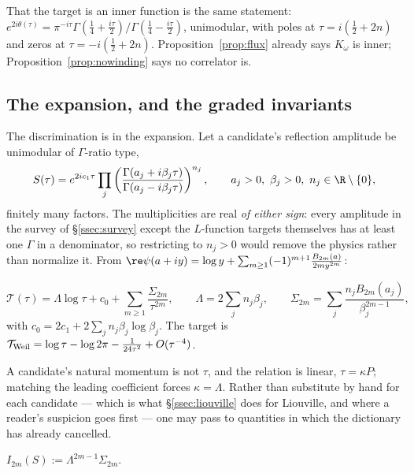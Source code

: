 That the target is an inner function is the same statement:
$e^{2i\theta(\tau)}=\pi^{-i\tau}\Gamma(\frac14+\frac{i\tau}2)/
\Gamma(\frac14-\frac{i\tau}2)$, unimodular, with poles at $\tau=i(\frac12+2n)$ and
zeros at $\tau=-i(\frac12+2n)$. Proposition~\ref{prop:flux} already says
$K_\omega$ is inner; Proposition~\ref{prop:nowinding} says no correlator is.

\subsection{The expansion, and the graded invariants}\label{ssec:invariants}

The discrimination is in the expansion. Let a candidate's reflection amplitude be
unimodular of $\Gamma$-ratio type,
\begin{equation}\label{eq:gammaratio}
 S(\tau)=e^{2ic_1\tau}\prod_j
 \left(\frac{\Gamma(a_j+i\beta_j\tau)}{\Gamma(a_j-i\beta_j\tau)}\right)^{n_j},
 \qquad a_j>0,\ \beta_j>0,\ n_j\in\R\setminus\{0\},
\end{equation}
finitely many factors. The multiplicities are real \emph{of either sign}: every
amplitude in the survey of \S\ref{ssec:survey} except the $L$-function targets
themselves has at least one $\Gamma$ in a denominator, so restricting to $n_j>0$
would remove the physics rather than normalize it. From
$\re\psi(a+iy)=\log y+\sum_{m\geq1}(-1)^{m+1}\frac{B_{2m}(a)}{2my^{2m}}$:

\begin{proposition}\label{prop:expansion}
\[
 \mathcal T(\tau)=\Lambda\log\tau+c_0
 +\sum_{m\geq1}\frac{\Sigma_{2m}}{\tau^{2m}},
 \qquad \Lambda=2\sum_jn_j\beta_j,\qquad
 \Sigma_{2m}=\sum_j\frac{n_jB_{2m}(a_j)}{\beta_j^{2m-1}},
\]
with $c_0=2c_1+2\sum_jn_j\beta_j\log\beta_j$. The target is
$\mathcal T_{\rm Weil}=\log\tau-\log2\pi-\frac1{24\tau^2}+O(\tau^{-4})$.
\end{proposition}

A candidate's natural momentum is not $\tau$, and the relation is linear,
$\tau=\kappa P$; matching the leading coefficient forces $\kappa=\Lambda$. Rather
than substitute by hand for each candidate --- which is what \S\ref{ssec:liouville}
does for Liouville, and where a reader's suspicion goes first --- one may pass to
quantities in which the dictionary has already cancelled.

\begin{definition}\label{def:invariants}
$I_{2m}(S):=\Lambda^{2m-1}\Sigma_{2m}$.
\end{definition}

